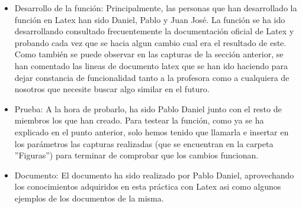 \documentclass{article}
\begin{document}
\begin{itemize}
        \vspace{1.95cm}
    
    	\item Desarrollo de la función: Principalmente, las personas que han desarrollado la función en Latex han sido Daniel, Pablo y Juan José. La función se ha ido desarrollando consultado frecuentemente la documentación oficial de Latex y probando cada vez que se hacia algun cambio cual era el resultado de este. Como también se puede observar en las capturas de la sección anterior, se han comentado las lineas de documento latex que se han ido haciendo para dejar constancia de funcionalidad tanto a la profesora como a cualquiera de nosotros que necesite buscar algo similar en el futuro.\\
    
    	\item Prueba: A la hora de probarlo, ha sido Pablo Daniel junto con el resto de miembros los que han creado. Para testear la función, como ya se ha explicado en el punto anterior, solo hemos tenido que llamarla e insertar en los parámetros las capturas realizadas (que se encuentran en la carpeta ''Figuras'') para terminar de comprobar que los cambios funcionan.\\
     
    	
    	\item Documento: El documento ha sido realizado por Pablo Daniel, aprovechando los conocimientos adquiridos en esta práctica con Latex asi como algunos ejemplos de los documentos de la misma.\\
    	
    \end{itemize}
\end{document}
